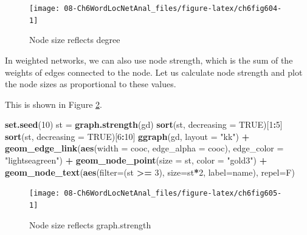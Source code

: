 \documentclass[
]{article}
\newenvironment{Shaded}{\begin{snugshade}}{\end{snugshade}}
\newcommand{\AttributeTok}[1]{\textcolor[rgb]{0.13,0.29,0.53}{#1}}
\newcommand{\ConstantTok}[1]{\textcolor[rgb]{0.56,0.35,0.01}{#1}}
\newcommand{\DecValTok}[1]{\textcolor[rgb]{0.00,0.00,0.81}{#1}}
\newcommand{\FunctionTok}[1]{\textcolor[rgb]{0.13,0.29,0.53}{\textbf{#1}}}
\newcommand{\NormalTok}[1]{#1}
\newcommand{\OtherTok}[1]{\textcolor[rgb]{0.56,0.35,0.01}{#1}}
\newcommand{\SpecialCharTok}[1]{\textcolor[rgb]{0.81,0.36,0.00}{\textbf{#1}}}
\newcommand{\StringTok}[1]{\textcolor[rgb]{0.31,0.60,0.02}{#1}}
\begin{document}
\begin{figure}

{\centering \texttt{[image: 08-Ch6WordLocNetAnal\_files/figure-latex/ch6fig604-1]} 

}

\caption{Node size reflects degree}\label{fig:ch6fig604}
\end{figure}

In weighted networks, we can also use node strength, which is the sum of the weights of edges connected to the node. Let us calculate node strength and plot the node sizes as proportional to these values.

This is shown in Figure \ref{fig:ch6fig605}.

\begin{Shaded}
\begin{Highlighting}[]
\FunctionTok{set.seed}\NormalTok{(}\DecValTok{10}\NormalTok{)}
\NormalTok{st }\OtherTok{=} \FunctionTok{graph.strength}\NormalTok{(gd)}
\FunctionTok{sort}\NormalTok{(st, }\AttributeTok{decreasing =} \ConstantTok{TRUE}\NormalTok{)[}\DecValTok{1}\SpecialCharTok{:}\DecValTok{5}\NormalTok{]}
\FunctionTok{sort}\NormalTok{(st, }\AttributeTok{decreasing =} \ConstantTok{TRUE}\NormalTok{)[}\DecValTok{6}\SpecialCharTok{:}\DecValTok{10}\NormalTok{]}
\FunctionTok{ggraph}\NormalTok{(gd, }\AttributeTok{layout =} \StringTok{"kk"}\NormalTok{) }\SpecialCharTok{+}
  \FunctionTok{geom\_edge\_link}\NormalTok{(}\FunctionTok{aes}\NormalTok{(}\AttributeTok{width =}\NormalTok{ cooc, }\AttributeTok{edge\_alpha =}\NormalTok{ cooc), }
                 \AttributeTok{edge\_color =} \StringTok{"lightseagreen"}\NormalTok{) }\SpecialCharTok{+}
  \FunctionTok{geom\_node\_point}\NormalTok{(}\AttributeTok{size =}\NormalTok{ st, }\AttributeTok{color =} \StringTok{"gold3"}\NormalTok{) }\SpecialCharTok{+}
  \FunctionTok{geom\_node\_text}\NormalTok{(}\FunctionTok{aes}\NormalTok{(}\AttributeTok{filter=}\NormalTok{(st }\SpecialCharTok{\textgreater{}=} \DecValTok{3}\NormalTok{), }\AttributeTok{size=}\NormalTok{st}\SpecialCharTok{*}\DecValTok{2}\NormalTok{, }\AttributeTok{label=}\NormalTok{name), }\AttributeTok{repel=}\NormalTok{F)}
\end{Highlighting}
\end{Shaded}

\begin{figure}

{\centering \texttt{[image: 08-Ch6WordLocNetAnal\_files/figure-latex/ch6fig605-1]} 

}

\caption{Node size reflects graph.strength}\label{fig:ch6fig605}
\end{figure}
\end{document}
